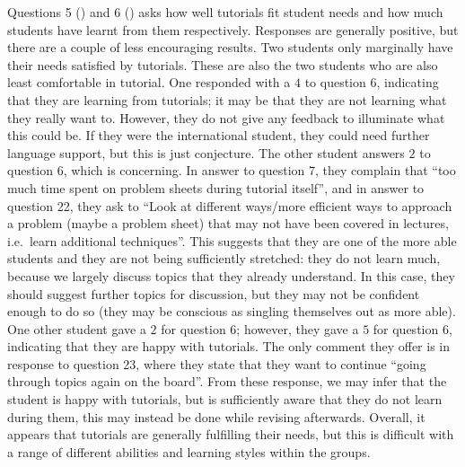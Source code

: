 Questions 5 () and 6 () asks how well tutorials fit student needs and how much students have learnt from them respectively. Responses are generally positive, but there are a couple of less encouraging results. Two students only marginally have their needs satisfied by tutorials. These are also the two students who are also least comfortable in tutorial. One responded with a $4$ to question 6, indicating that they are learning from tutorials; it may be that they are not learning what they really want to. However, they do not give any feedback to illuminate what this could be. If they were the international student, they could need further language support, but this is just conjecture. The other student answers $2$ to question 6, which is concerning. In answer to question 7, they complain that ``too much time spent on problem sheets during tutorial itself'', and in answer to question 22, they ask to ``Look at different ways/more efficient ways to approach a problem (maybe a problem sheet) that may not have been covered in lectures, i.e.\ learn additional techniques''. This suggests that they are one of the more able students and they are not being sufficiently stretched: they do not learn much, because we largely discuss topics that they already understand. In this case, they should suggest further topics for discussion, but they may not be confident enough to do so (they may be conscious as singling themselves out as more able). One other student gave a $2$ for question 6; however, they gave a $5$ for question 6, indicating that they are happy with tutorials. The only comment they offer is in response to question 23, where they state that they want to continue ``going through topics again on the board''. From these response, we may infer that the student is happy with tutorials, but is sufficiently aware that they do not learn during them, this may instead be done while revising afterwards. Overall, it appears that tutorials are generally fulfilling their needs, but this is difficult with a range of different abilities and learning styles within the groups.

